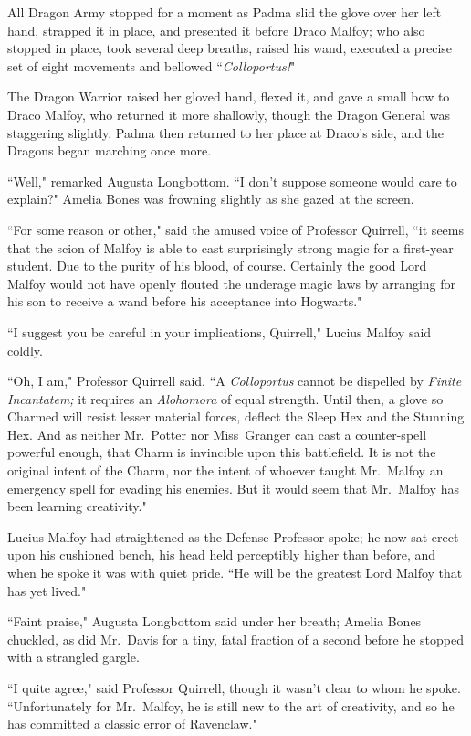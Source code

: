 All Dragon Army stopped for a moment as Padma slid the glove over her left hand, strapped it in place, and presented it before Draco Malfoy; who also stopped in place, took several deep breaths, raised his wand, executed a precise set of eight movements and bellowed ``\emph{Colloportus!}"

The Dragon Warrior raised her gloved hand, flexed it, and gave a small bow to Draco Malfoy, who returned it more shallowly, though the Dragon General was staggering slightly. Padma then returned to her place at Draco's side, and the Dragons began marching once more.

``Well," remarked Augusta Longbottom. ``I don't suppose someone would care to explain?" Amelia Bones was frowning slightly as she gazed at the screen.

``For some reason or other," said the amused voice of Professor Quirrell, ``it seems that the scion of Malfoy is able to cast surprisingly strong magic for a first-year student. Due to the purity of his blood, of course. Certainly the good Lord Malfoy would not have openly flouted the underage magic laws by arranging for his son to receive a wand before his acceptance into Hogwarts."

``I suggest you be careful in your implications, Quirrell," Lucius Malfoy said coldly.

``Oh, I am," Professor Quirrell said. ``A \emph{Colloportus} cannot be dispelled by \emph{Finite Incantatem;} it requires an \emph{Alohomora} of equal strength. Until then, a glove so Charmed will resist lesser material forces, deflect the Sleep Hex and the Stunning Hex. And as neither Mr.~Potter nor Miss~Granger can cast a counter-spell powerful enough, that Charm is invincible upon this battlefield. It is not the original intent of the Charm, nor the intent of whoever taught Mr.~Malfoy an emergency spell for evading his enemies. But it would seem that Mr.~Malfoy has been learning creativity."

Lucius Malfoy had straightened as the Defense Professor spoke; he now sat erect upon his cushioned bench, his head held perceptibly higher than before, and when he spoke it was with quiet pride. ``He will be the greatest Lord Malfoy that has yet lived."

``Faint praise," Augusta Longbottom said under her breath; Amelia Bones chuckled, as did Mr.~Davis for a tiny, fatal fraction of a second before he stopped with a strangled gargle.

``I quite agree," said Professor Quirrell, though it wasn't clear to whom he spoke. ``Unfortunately for Mr.~Malfoy, he is still new to the art of creativity, and so he has committed a classic error of Ravenclaw."

